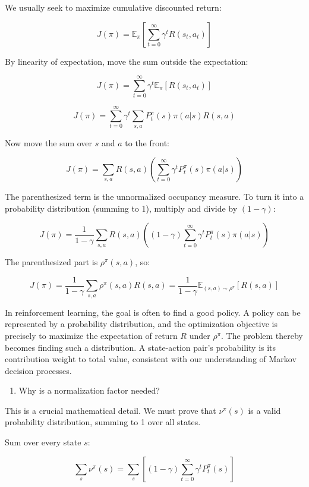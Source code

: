 We usually seek to maximize cumulative discounted return:

\[
J(\pi) = \mathbb{E}_\pi\left[\sum_{t=0}^{\infty}\gamma^t R(s_t,a_t)\right]
\]

By linearity of expectation, move the sum outside the expectation:

\[
J(\pi) = \sum_{t=0}^{\infty}\gamma^t\mathbb{E}_\pi[R(s_t,a_t)]
\]

\[
J(\pi) = \sum_{t=0}^{\infty}\gamma^t\sum_{s,a}P_t^\pi(s)\pi(a|s)R(s,a)
\]

Now move the sum over \(s\) and \(a\) to the front:

\[
J(\pi) = \sum_{s,a}R(s,a)\left(\sum_{t=0}^{\infty}\gamma^t P_t^\pi(s)\pi(a|s)\right)
\]

The parenthesized term is the unnormalized occupancy measure. To turn it into a probability distribution (summing to 1), multiply and divide by \((1-\gamma)\):

\[
J(\pi) = \frac{1}{1-\gamma}\sum_{s,a}R(s,a)\left((1-\gamma)\sum_{t=0}^{\infty}\gamma^t P_t^\pi(s)\pi(a|s)\right)
\]

The parenthesized part is \(\rho^\pi(s,a)\), so:

\[
J(\pi) = \frac{1}{1-\gamma}\sum_{s,a}\rho^\pi(s,a)R(s,a) = \frac{1}{1-\gamma}\mathbb{E}_{(s,a)\sim\rho^\pi}[R(s,a)]
\]

In reinforcement learning, the goal is often to find a good policy. A policy can be represented by a probability distribution, and the optimization objective is precisely to maximize the expectation of return \(R\) under \(\rho^\pi\). The problem thereby becomes finding such a distribution. A state-action pair's probability is its contribution weight to total value, consistent with our understanding of Markov decision processes.

\begin{enumerate}
\def\labelenumi{\arabic{enumi}.}
\setcounter{enumi}{1}
\tightlist
\item
  Why is a normalization factor needed?
\end{enumerate}

This is a crucial mathematical detail. We must prove that \(\nu^\pi(s)\) is a valid probability distribution, summing to 1 over all states.

Sum over every state \(s\):

\[
\sum_s \nu^\pi(s) = \sum_s\left[(1-\gamma)\sum_{t=0}^{\infty}\gamma^t P_t^\pi(s)\right]
\]

